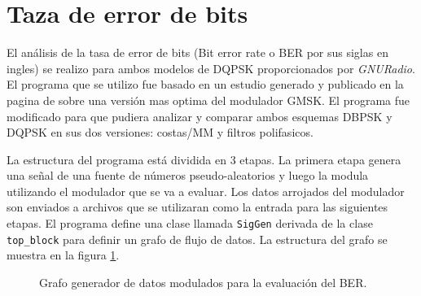 \section{Taza de error de bits}

El an\'alisis de la tasa de error de bits (Bit error rate o BER por sus siglas en ingles) se realizo
para ambos modelos de DQPSK proporcionados por \emph{GNURadio}. El programa que se utilizo fue
basado en un estudio generado y publicado en la pagina de \gnuradio sobre una versi\'on mas optima
del modulador GMSK. El programa fue modificado para que pudiera analizar y comparar ambos esquemas
DBPSK y DQPSK en sus dos versiones: costas/MM y filtros polifasicos.

La estructura del programa est\'a dividida en 3 etapas. La primera etapa genera una se\~nal de una
fuente de n\'umeros pseudo-aleatorios y luego la modula utilizando el modulador que se va a evaluar.
Los datos arrojados del modulador son enviados a archivos que se utilizaran como la entrada para las
siguientes etapas. El programa define una clase llamada \verb|SigGen| derivada de la clase
\verb|top_block| para definir un grafo de flujo de datos. La estructura del grafo se muestra en la
figura \ref{fig:siggen}.

\begin{figure}[htp]
  \centering
  \vspace{0.3in}
  \vspace{0.3in}
  \caption{Grafo generador de datos modulados para la evaluaci\'on del BER.}
  \label{fig:siggen}
\end{figure}

